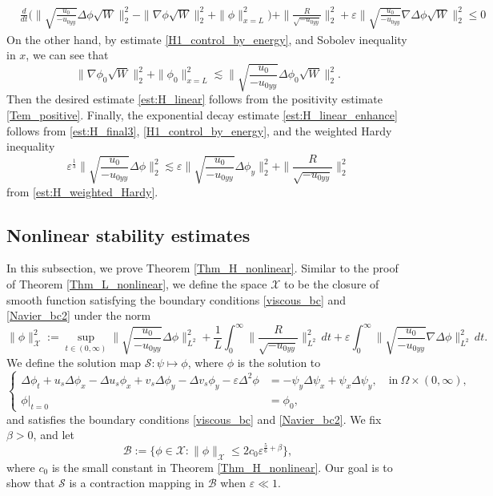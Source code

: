\documentclass[reqno, 11pt]{amsart}
\theoremstyle{plain}
\theoremstyle{definition}
\theoremstyle{remark}
\numberwithin{equation}{section}
\newcommand\cB{\mathcal{B}}
\newcommand\cS{\mathcal{S}}
\newcommand\cX{\mathcal{X}}
\begin{document}
\begin{equation}\label{est:H_final3}
\begin{aligned}
&\frac{d}{dt}\Big( \|\sqrt{\frac{u_0}{-u_{0yy}}} \Delta \phi \sqrt{W}\|_2^2 - \| \nabla \phi \sqrt{W}\|_2^2 + \| \phi\|_{x=L}^2 \Big)+  \|\frac{R}{\sqrt{-u_{0yy}}}\|_2^2 +  \varepsilon  \| \sqrt{\frac{u_0}{-u_{0yy}}} \nabla \Delta \phi \sqrt{W}\|_2^2 \le 0
\end{aligned}
\end{equation}
On the other hand, by estimate \eqref{H1_control_by_energy}, and Sobolev inequality in $x$, we can see that 
$$
 \| \nabla \phi_0 \sqrt{W}\|_2^2 + \| \phi_0\|_{x=L}^2 \lesssim  \|\sqrt{\frac{u_0}{-u_{0yy}}} \Delta \phi_0 \sqrt{W}\|_2^2.
$$
Then the desired estimate \eqref{est:H_linear} follows from the positivity estimate \eqref{Tem_positive}. Finally, the exponential decay estimate \eqref{est:H_linear_enhance} follows from \eqref{est:H_final3}, \eqref{H1_control_by_energy}, and the weighted Hardy inequality
$$
\varepsilon^{\frac{1}{3}}\| \sqrt{\frac{u_0}{-u_{0yy}}}  \Delta \phi\|_2^2 \lesssim \varepsilon \| \sqrt{\frac{u_0}{-u_{0yy}}} \Delta \phi_y\|_2^2 + \|\frac{R}{\sqrt{-u_{0yy}}}\|_2^2
$$
from \eqref{est:H_weighted_Hardy}.








\subsection{Nonlinear stability estimates}\label{sec:H_nonlinear} In this subsection, we prove Theorem \ref{Thm_H_nonlinear}. Similar to the proof of Theorem \ref{Thm_L_nonlinear}, we define the space $\cX$ to be the closure of smooth function satisfying the boundary conditions \eqref{viscous_bc} and \eqref{Navier_bc2} under the norm
$$
\| \phi \|_{\cX}^2:= \sup_{t \in (0,\infty)} \| \sqrt{\frac{u_0}{-u_{0yy}}}  \Delta \phi\|_{L^2}^2 + \frac{1}{L} \int_0^\infty  \|\frac{R}{\sqrt{-u_{0yy}}}\|_{L^2}^2 \, dt + \varepsilon \int_0^\infty  \| \sqrt{\frac{u_0}{-u_{0yy}}} \nabla\Delta \phi\|_{L^2}^2 \, dt.
$$
We define the solution map $\cS: \psi \mapsto \phi$, where $\phi$ is the solution to
\begin{equation}\label{Nonlinear_new_H}
\left\{\begin{aligned}
\Delta \phi_t + u_s \Delta \phi_x - \Delta u_s \phi_x + v_s \Delta \phi_y - \Delta v_s \phi_y - \varepsilon \Delta^2 \phi &= -\psi_y \Delta \psi_x + \psi_x \Delta \psi_y, \quad \mbox{in}~\Omega \times (0,\infty),\\
\phi|_{t=0} &= \phi_0,
\end{aligned}\right.
\end{equation}
and satisfies the boundary conditions \eqref{viscous_bc} and \eqref{Navier_bc2}. We fix $\beta > 0$, and let 
$$
\cB := \{ \phi \in \cX : \| \phi \|_{\cX} \le 2 c_0 \varepsilon^{\frac{5}{6}+ \beta} \},
$$
where $c_0$ is the small constant in Theorem \ref{Thm_H_nonlinear}. Our goal is to show that $\cS$ is a contraction mapping in $\cB$ when $\varepsilon \ll 1$.
\end{document}
